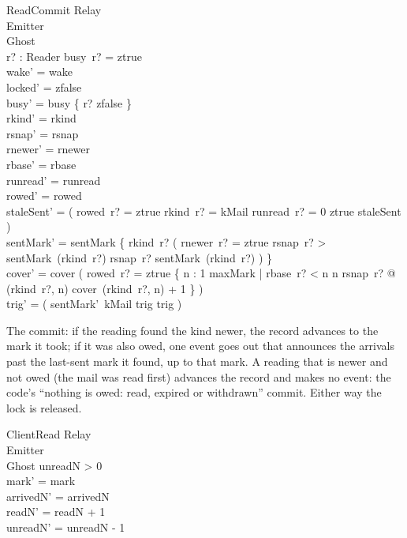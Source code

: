 \documentclass[a4paper,10pt,fleqn]{article}
\begin{document}
\begin{schema}{ReadCommit}
  \Xi Relay \\
  \Delta Emitter \\
  \Delta Ghost \\
  r? : Reader
  \where
  busy~r? = ztrue \\
  wake' = wake \\
  locked' = zfalse \\
  busy' = busy \oplus \{ r? \mapsto zfalse \} \\
  rkind' = rkind \\
  rsnap' = rsnap \\
  rnewer' = rnewer \\
  rbase' = rbase \\
  runread' = runread \\
  rowed' = rowed \\
  staleSent' = ( \IF rowed~r? = ztrue \land rkind~r? = kMail \land
    runread~r? = 0 \THEN ztrue \ELSE staleSent ) \\
  sentMark' = sentMark \oplus
    \{ rkind~r? \mapsto ( \IF rnewer~r? = ztrue \land
         rsnap~r? > sentMark~(rkind~r?)
       \THEN rsnap~r? \ELSE sentMark~(rkind~r?) ) \} \\
  cover' = cover \oplus
    ( \IF rowed~r? = ztrue \THEN
        \{ n : 1 \upto maxMark | rbase~r? < n \land
             n \leq rsnap~r? @
             (rkind~r?, n) \mapsto cover~(rkind~r?, n) + 1 \}
      \ELSE \emptyset ) \\
  trig' = ( \IF sentMark'~kMail \geq trig  \ELSE trig )
\end{schema}

The commit: if the reading found the kind newer, the record advances to the mark it
took; if it was also owed, one event goes out that announces the arrivals past the
last-sent mark it found, up to that mark.  A reading that is newer and not owed
(the mail was read first) advances the record and makes no event: the code's
``nothing is owed: read, expired or withdrawn'' commit.  Either way the lock is
released.

\begin{schema}{ClientRead}
  \Delta Relay \\
  \Xi Emitter \\
  \Xi Ghost
  \where
  unreadN > 0 \\
  mark' = mark \\
  arrivedN' = arrivedN \\
  readN' = readN + 1 \\
  unreadN' = unreadN - 1
\end{schema}
\end{document}
